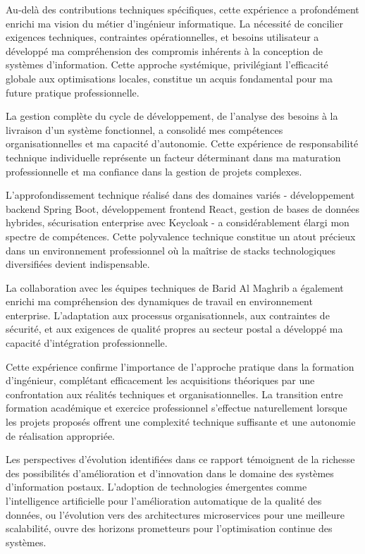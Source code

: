 Au-delà des contributions techniques spécifiques, cette expérience a profondément enrichi ma vision du métier d'ingénieur informatique. La nécessité de concilier exigences techniques, contraintes opérationnelles, et besoins utilisateur a développé ma compréhension des compromis inhérents à la conception de systèmes d'information. Cette approche systémique, privilégiant l'efficacité globale aux optimisations locales, constitue un acquis fondamental pour ma future pratique professionnelle.

La gestion complète du cycle de développement, de l'analyse des besoins à la livraison d'un système fonctionnel, a consolidé mes compétences organisationnelles et ma capacité d'autonomie. Cette expérience de responsabilité technique individuelle représente un facteur déterminant dans ma maturation professionnelle et ma confiance dans la gestion de projets complexes.

L'approfondissement technique réalisé dans des domaines variés - développement backend Spring Boot, développement frontend React, gestion de bases de données hybrides, sécurisation enterprise avec Keycloak - a considérablement élargi mon spectre de compétences. Cette polyvalence technique constitue un atout précieux dans un environnement professionnel où la maîtrise de stacks technologiques diversifiées devient indispensable.

La collaboration avec les équipes techniques de Barid Al Maghrib a également enrichi ma compréhension des dynamiques de travail en environnement enterprise. L'adaptation aux processus organisationnels, aux contraintes de sécurité, et aux exigences de qualité propres au secteur postal a développé ma capacité d'intégration professionnelle.

Cette expérience confirme l'importance de l'approche pratique dans la formation d'ingénieur, complétant efficacement les acquisitions théoriques par une confrontation aux réalités techniques et organisationnelles. La transition entre formation académique et exercice professionnel s'effectue naturellement lorsque les projets proposés offrent une complexité technique suffisante et une autonomie de réalisation appropriée.

Les perspectives d'évolution identifiées dans ce rapport témoignent de la richesse des possibilités d'amélioration et d'innovation dans le domaine des systèmes d'information postaux. L'adoption de technologies émergentes comme l'intelligence artificielle pour l'amélioration automatique de la qualité des données, ou l'évolution vers des architectures microservices pour une meilleure scalabilité, ouvre des horizons prometteurs pour l'optimisation continue des systèmes.

